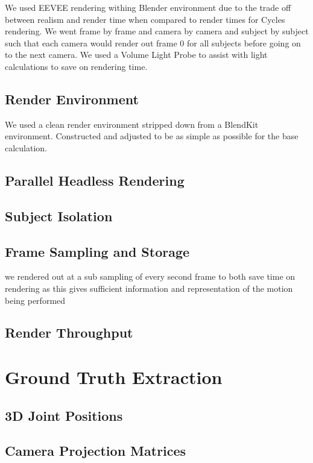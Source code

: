 We used EEVEE rendering withing Blender environment due to the trade off between realism and render time when compared to render times for Cycles rendering. 
We went frame by frame and camera by camera and subject by subject such that each camera would render out frame 0 for all subjects before going on to the next camera.
We used a Volume Light Probe to assist with light calculations to save on rendering time.

\subsection{Render Environment}

We used a clean render environment stripped down from a BlendKit environment. Constructed and adjusted to be as simple as possible for the base calculation.

\subsection{Parallel Headless Rendering}

\subsection{Subject Isolation}

\subsection{Frame Sampling and Storage}

we rendered out at a sub sampling of every second frame to both save time on rendering as this gives sufficient information and representation of the motion being performed

\subsection{Render Throughput}

\section{Ground Truth Extraction}
\label{sec:groundtruth}

\subsection{3D Joint Positions}
\cite{needham2021accuracy, patel2021agora}

\subsection{Camera Projection Matrices}


